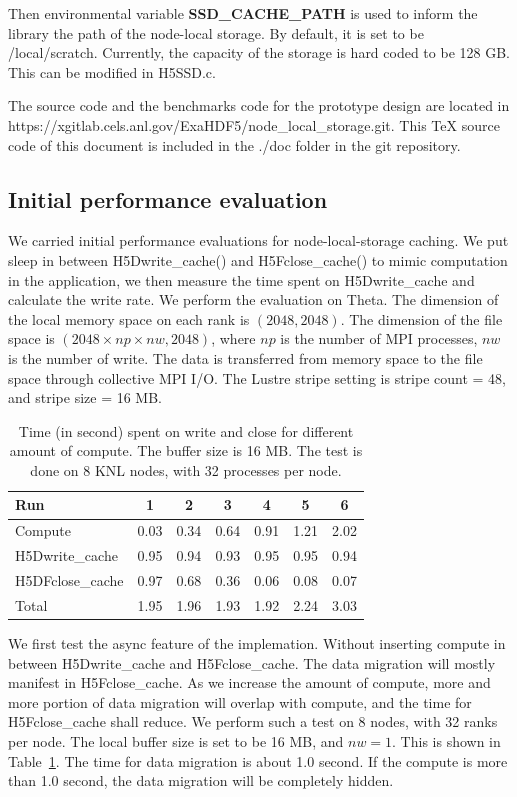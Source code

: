 \documentclass[aps, rmp, 11pt, notitlepage]{revtex4-1}
\begin{document}
Then environmental variable \textbf{SSD\_CACHE\_PATH} is used to inform the library the path of the node-local storage. By default, it is set to be /local/scratch. Currently, the capacity of the storage is hard coded to be 128 GB. This can be modified in H5SSD.c. 

The source code and the benchmarks code for the prototype design are located in \\https://xgitlab.cels.anl.gov/ExaHDF5/node\_local\_storage.git. This TeX source code of this document is included in the ./doc folder in the git repository. 
\subsection{Initial performance evaluation}


We carried initial performance evaluations for node-local-storage caching. We put sleep in between H5Dwrite\_cache() and H5Fclose\_cache() to mimic computation in the application, we then measure the time spent on H5Dwrite\_cache and calculate the write rate. We perform the evaluation on Theta. The dimension of the local memory space on each rank is $(2048, 2048)$. The dimension of the file space is $(2048\times np\times nw, 2048)$, where $np$ is the number of MPI processes, $nw$ is the number of write. The data is transferred from memory space to the file space through collective MPI I/O. The Lustre stripe setting is stripe count = 48, and stripe size = 16 MB. 

\begin{table}[hbt]
\centering
\caption{Time (in second) spent on write and close for different amount of compute. The buffer size is 16 MB. The test is done on 8 KNL nodes, with 32 processes per node. }\label{tab:async}
\begin{tabular}{l||cccccc}
\hline
Run & 1 & 2 & 3 & 4 & 5 & 6 \\
\hline
\hline
Compute     & 0.03 &  0.34 & 0.64 & 0.91 & 1.21  & 2.02\\
H5Dwrite\_cache &  0.95 & 0.94 & 0.93 &  0.95 & 0.95  & 0.94 \\
H5DFclose\_cache & 0.97  & 0.68 & 0.36 & 0.06 & 0.08 & 0.07\\ 
\hline
\hline
Total & 1.95  & 1.96 & 1.93 & 1.92 & 2.24 & 3.03 \\
\hline
\end{tabular}
\end{table}
We first test the async feature of the implemation. Without inserting compute in between H5Dwrite\_cache and H5Fclose\_cache. The data migration will mostly manifest in H5Fclose\_cache. As we increase the amount of compute, more and more portion of data migration will overlap with compute, and the time for H5Fclose\_cache shall reduce. We perform such a test on 8 nodes, with 32 ranks per node. The local buffer size is set to be 16 MB, and $nw=1$. This is shown in Table~\ref{tab:async}. The time for data migration is about 1.0 second. If the compute is more than 1.0 second, the data migration will be completely hidden. 
\end{document}
